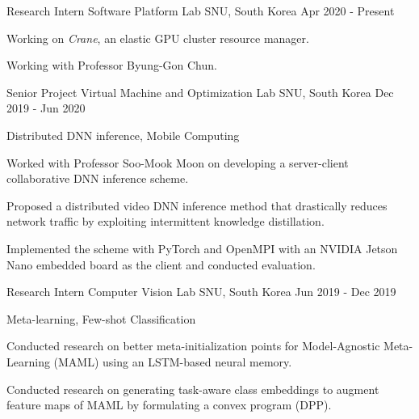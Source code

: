 

\begin{cventries}

  \cventry
    {Research Intern} %
    {Software Platform Lab} %
    {SNU, South Korea} %
    {Apr 2020 - Present} %
    {
      \begin{cvitems} %
        \item {Working on \textit{Crane}, an elastic GPU cluster resource manager.}
        \item {Working with Professor Byung-Gon Chun.}
      \end{cvitems}
    }
    
  \cventry
    {Senior Project} %
    {Virtual Machine and Optimization Lab} %
    {SNU, South Korea} %
    {Dec 2019 - Jun 2020} %
    {
      \begin{cvitems} %
        \item {Distributed DNN inference, Mobile Computing}
        \item {Worked with Professor Soo-Mook Moon on developing a server-client collaborative DNN inference scheme.}
        \item {Proposed a distributed video DNN inference method that drastically reduces network traffic by exploiting intermittent knowledge distillation.}
        \item {Implemented the scheme with PyTorch and OpenMPI with an NVIDIA Jetson Nano embedded board as the client and conducted evaluation.}
      \end{cvitems}
    }
    
  \cventry
    {Research Intern} %
    {Computer Vision Lab} %
    {SNU, South Korea} %
    {Jun 2019 - Dec 2019} %
    {
      \begin{cvitems} %
        \item {Meta-learning, Few-shot Classification}
        \item {Conducted research on better meta-initialization points for Model-Agnostic Meta-Learning (MAML) using an LSTM-based neural memory.}
        \item {Conducted research on generating task-aware class embeddings to augment feature maps of MAML by formulating a convex program (DPP).}
      \end{cvitems}
    }
    

\end{cventries}
